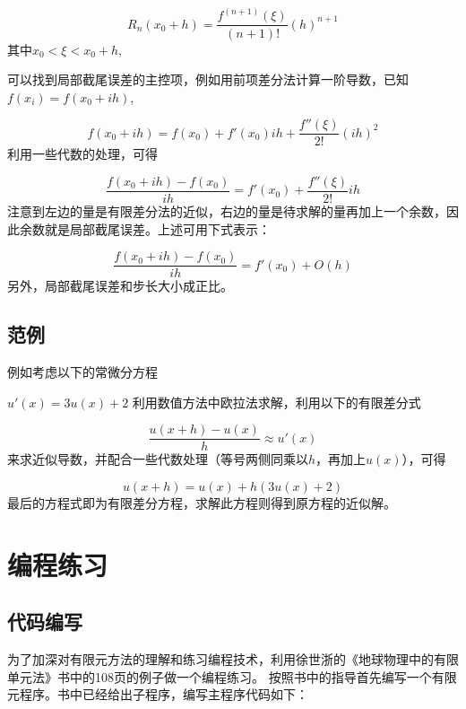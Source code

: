 \documentclass[hyperref,UTF-8]{ctexart}
\begin{document}
$$R_n(x_0 + h) = \frac{f^{(n+1)}(\xi)}{(n+1)!} (h)^{n+1}$$
 其中$ x_0 < \xi < x_0 + h$,
 
 可以找到局部截尾误差的主控项，例如用前项差分法计算一阶导数，已知$f(x_i)=f(x_0+i h)$,

$$ f(x_0 + i h) = f(x_0) + f'(x_0)i h + \frac{f''(\xi)}{2!} (i h)^{2}$$
利用一些代数的处理，可得

$$ \frac{f(x_0 + i h) - f(x_0)}{i h} = f'(x_0) + \frac{f''(\xi)}{2!} i h$$
注意到左边的量是有限差分法的近似，右边的量是待求解的量再加上一个余数，因此余数就是局部截尾误差。上述可用下式表示：

$$ \frac{f(x_0 + i h) - f(x_0)}{i h} = f'(x_0) + O(h)$$
另外，局部截尾误差和步长大小成正比。
\subsection{范例}
例如考虑以下的常微分方程

$ u'(x) = 3u(x) + 2$
利用数值方法中欧拉法求解，利用以下的有限差分式

$$\frac{u(x+h) - u(x)}{h} \approx u'(x)$$
来求近似导数，并配合一些代数处理（等号两侧同乘以$h$，再加上$u(x)$），可得

$$ u(x+h) = u(x) + h(3u(x)+2)$$
最后的方程式即为有限差分方程，求解此方程则得到原方程的近似解。
\section{编程练习}
\subsection{代码编写}
为了加深对有限元方法的理解和练习编程技术，利用徐世浙的《地球物理中的有限单元法》书中的108页的例子做一个编程练习。
按照书中的指导首先编写一个有限元程序。书中已经给出子程序，编写主程序代码如下：
\end{document}
